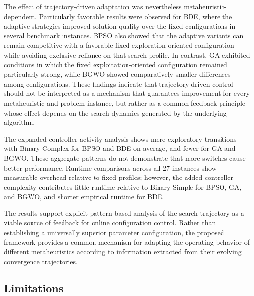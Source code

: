 \documentclass[mathematics,article,accept,moreauthors]{Definitions/mdpi}
\begin{document}
The effect of trajectory-driven adaptation was nevertheless
metaheuristic-dependent. Particularly favorable results were observed for
BDE, where the adaptive strategies improved solution quality over the fixed
configurations in several benchmark instances. BPSO also showed that the
adaptive variants can remain competitive with a favorable fixed
exploration-oriented configuration while avoiding exclusive reliance on
that search profile. In contrast, GA exhibited conditions in which the
fixed exploitation-oriented configuration remained particularly strong,
while BGWO showed comparatively smaller differences among configurations.
These findings indicate that trajectory-driven control should not be
interpreted as a mechanism that guarantees improvement for every
metaheuristic and problem instance, but rather as a common feedback
principle whose effect depends on the search dynamics generated by the
underlying algorithm.

The expanded controller-activity analysis shows more exploratory
transitions with Binary-Complex for BPSO and BDE on average, and fewer for
GA and BGWO. These aggregate patterns do not demonstrate that more
switches cause better performance. Runtime comparisons across all 27
instances show measurable overhead relative to fixed profiles; however,
the added controller complexity contributes little runtime relative to
Binary-Simple for BPSO, GA, and BGWO, and shorter empirical runtime for BDE.

The results support explicit pattern-based analysis of the search
trajectory as a viable source of feedback for online configuration control.
Rather than establishing a universally superior parameter configuration,
the proposed framework provides a common mechanism for adapting the
operating behavior of different metaheuristics according to information
extracted from their evolving convergence trajectories.


\subsection{Limitations}
\label{subsec:limitations}
\end{document}
